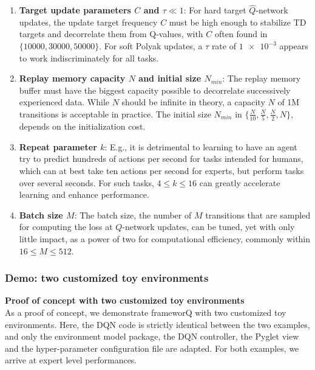 \begin{enumerate}
    \item \textbf{Target update parameters $C$ and $\tau \ll 1$}: For hard target $\hat{Q}$-network updates, the update target frequency $C$ must be high enough to stabilize TD targets and decorrelate them from Q-values, with $C$ often found in $\{10000,30000,50000\}$. For soft Polyak updates, a $\tau$ rate of $\num{1e-3}$ appears to work indiscriminately for all tasks.
    \item \textbf{Replay memory capacity $N$ and initial size $N_{min}$}: The replay memory buffer must have the biggest capacity possible to decorrelate successively experienced data. While $N$ should be infinite in theory, a capacity $N$ of 1M transitions is acceptable in practice. The initial size $N_{min}$ in $\{\frac{N}{10},\frac{N}{5},\frac{N}{2},N\}$, depends on the initialization cost.
    \item \textbf{Repeat parameter $k$}: E.g., it is detrimental to learning to have an agent try to predict hundreds of actions per second for tasks intended for humans, which can at best take ten actions per second for experts, but perform tasks over several seconds. For such tasks, $4 \leq k \leq 16$ can greatly accelerate learning and enhance performance.
    \item \textbf{Batch size $M$}: The batch size, the number of $M$ transitions that are sampled for computing the loss at $Q$-network updates, can be tuned, yet with only little impact, as a power of two for computational efficiency, commonly within $16 \leq M \leq 512$. 
\end{enumerate}

\subsubsection{Demo: two customized toy environments} \label{basics}

\textbf{Proof of concept with two customized toy environments} \\
As a proof of concept, we demonstrate frameworQ with two customized toy environments. Here, the DQN code is strictly identical between the two examples, and only the environment model package, the DQN controller, the Pyglet view and the hyper-parameter configuration file are adapted. For both examples, we arrive at expert level performances. \\

